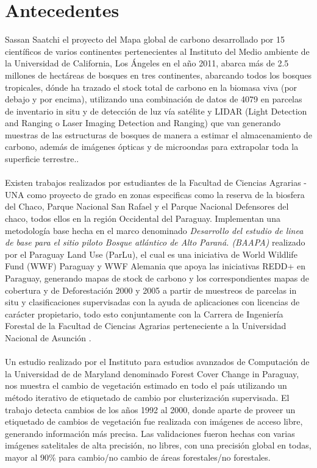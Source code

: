 \section{Antecedentes}
	Sassan Saatchi\cite{saatchi2011benchmark} el proyecto del Mapa global de carbono desarrollado por 15 cient\'ificos de varios continentes pertenecientes al Instituto del Medio ambiente de la Universidad de California, Los \'Angeles en el a\~{n}o 2011, abarca m\'as de 2.5 millones de hect\'areas de bosques en tres continentes, abarcando todos los bosques tropicales, d\'onde ha trazado el stock total de carbono en la biomasa viva (por debajo y por encima), utilizando una combinaci\'on de datos de 4079 en parcelas de
	inventario in situ y de detecci\'on de luz v\'ia sat\'elite y LIDAR (Light Detection and Ranging o Laser Imaging Detection and
	Ranging) que van generando muestras de las estructuras de bosques de manera a estimar el almacenamiento de carbono,
	adem\'as de im\'agenes \'opticas y de microondas para extrapolar toda la superficie terrestre..\\~\\
	Existen trabajos realizados por estudiantes de la Facultad de Ciencias Agrarias - UNA como proyecto de grado en zonas especificas como la reserva de la biosfera del Chaco, Parque Nacional San Rafael y el Parque Nacional Defensores del chaco, todos ellos en la regi\'on Occidental del Paraguay. Implementan una metodolog\'ia base hecha en el marco denominado \textit{Desarrollo del estudio de linea de base para el sitio piloto Bosque atl\'antico de Alto Paran\'a. (BAAPA)} realizado por el Paraguay Land Use (ParLu), el cual es una iniciativa de World Wildlife Fund (WWF)	Paraguay y WWF Alemania que apoya las iniciativas REDD+ en Paraguay, generando mapas de stock de carbono y los correspondientes mapas de cobertura y de Deforestaci\'on 2000 y 2005 a partir de muestreos de parcelas in situ y clasificaciones supervisadas con la ayuda de aplicaciones con licencias de car\'acter propietario, todo esto conjuntamente con la  Carrera de Ingenier\'ia Forestal de la Facultad de Ciencias Agrarias perteneciente a la Universidad Nacional de Asunci\'on .\\~\\
	Un estudio realizado por el Instituto para estudios avanzados de Computaci\'on de la Universidad de de Maryland denominado Forest Cover Change in Paraguay, nos muestra el cambio de vegetaci\'on estimado en todo el pa\'is utilizando un m\'etodo iterativo de etiquetado de cambio por clusterizaci\'on supervisada. El trabajo detecta cambios de los a\~{n}os 1992 al 2000, donde aparte de proveer un etiquetado de cambios de vegetaci\'on fue realizada con im\'agenes de acceso libre, generando informaci\'on m\'as precisa. Las validaciones fueron hechas con varias im\'agenes satelitales de alta precisi\'on, no libres, con una precisi\'on global en todas, mayor al 90\% para cambio/no cambio de \'areas forestales/no forestales\cite{huang2009assessment}.

